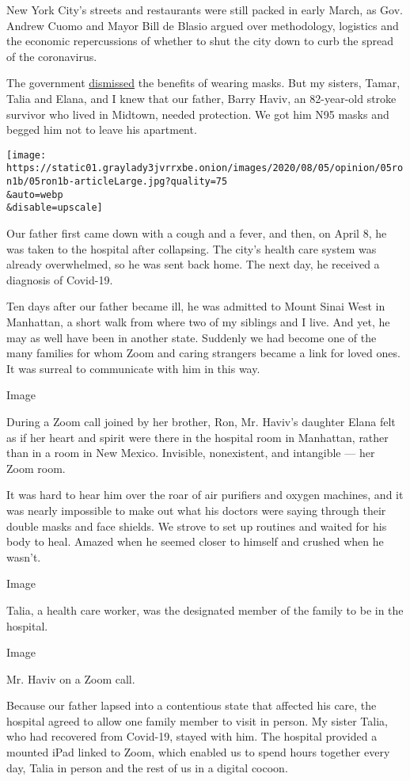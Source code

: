 New York City's streets and restaurants were still packed in early
March, as Gov. Andrew Cuomo and Mayor Bill de Blasio argued over
methodology, logistics and the economic repercussions of whether to shut
the city down to curb the spread of the coronavirus.

The government
\href{https://www.politico.com/news/2020/03/30/coronavirus-masks-trump-administration-156327}{dismissed}
the benefits of wearing masks. But my sisters, Tamar, Talia and Elana,
and I knew that our father, Barry Haviv, an 82-year-old stroke survivor
who lived in Midtown, needed protection. We got him N95 masks and begged
him not to leave his apartment.

\texttt{[image: https://static01.graylady3jvrrxbe.onion/images/2020/08/05/opinion/05ron1b/05ron1b-articleLarge.jpg?quality=75\\\&auto=webp\\\&disable=upscale]}

Our father first came down with a cough and a fever, and then, on April
8, he was taken to the hospital after collapsing. The city's health care
system was already overwhelmed, so he was sent back home. The next day,
he received a diagnosis of Covid-19.

Ten days after our father became ill, he was admitted to Mount Sinai
West in Manhattan, a short walk from where two of my siblings and I
live. And yet, he may as well have been in another state. Suddenly we
had become one of the many families for whom Zoom and caring strangers
became a link for loved ones. It was surreal to communicate with him in
this way.

Image

During a Zoom call joined by her brother, Ron, Mr. Haviv's daughter
Elana felt as if her heart and spirit were there in the hospital room in
Manhattan, rather than in a room in New Mexico. Invisible, nonexistent,
and intangible --- her Zoom room.

It was hard to hear him over the roar of air purifiers and oxygen
machines, and it was nearly impossible to make out what his doctors were
saying through their double masks and face shields. We strove to set up
routines and waited for his body to heal. Amazed when he seemed closer
to himself and crushed when he wasn't.

Image

Talia, a health care worker, was the designated member of the family to
be in the hospital.

Image

Mr. Haviv on a Zoom call.

Because our father lapsed into a contentious state that affected his
care, the hospital agreed to allow one family member to visit in person.
My sister Talia, who had recovered from Covid-19, stayed with him. The
hospital provided a mounted iPad linked to Zoom, which enabled us to
spend hours together every day, Talia in person and the rest of us in a
digital cocoon.

